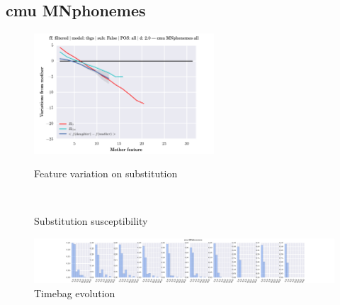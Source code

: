 \clearpage
\subsection{cmu MNphonemes}
\begin{figure}[h!]
    \centering
    \includegraphics[width=0.6\textwidth]{images/feature-cards/cmu_MNphonemes/feature_variations.png}
    \caption{Feature variation on substitution}
	~
	\caption{Substitution susceptibility}
    \includegraphics[width=\textwidth]{images/feature-cards/cmu_MNphonemes/timebags_evolution-hist.png}
	\caption{Timebag evolution}
\end{figure}


\clearpage
